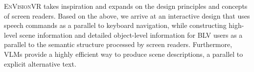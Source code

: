 
\textsc{EnVisionVR} takes inspiration and expands on the design principles and concepts of screen readers. %
Based on the above, we arrive at an interactive design that uses speech commands as a parallel to keyboard navigation, while constructing high-level scene information and detailed object-level information for BLV users as a parallel to the semantic structure processed by screen readers. Furthermore, %
VLMs provide a highly efficient way to produce scene descriptions, %
a parallel to explicit alternative text.

